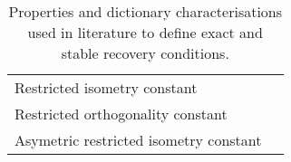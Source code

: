 \begin{table}[!bp]
\begin{adjustbox}{width=1\textwidth}
\begin{tabular}{cc}
\multicolumn{1}{l}{Restricted isometry constant} & \multicolumn{1}{l}{\cite{Cand`es2005b,Baraniuk2008,Cand`es2008a}} \\ %
\multicolumn{1}{l}{Restricted orthogonality constant} & \multicolumn{1}{l}{\cite{Cand`es2005b}} \\ %
\multicolumn{1}{l}{Asymetric restricted isometry constant} & \multicolumn{1}{l}{\cite{Davies2008,Davies2009}} \\ %
  \bottomrule %
\end{tabular}
\end{adjustbox}
\caption{Properties and dictionary characterisations used in literature to define exact and stable recovery conditions.}
\label{table:ERC_properties}
\end{table}
